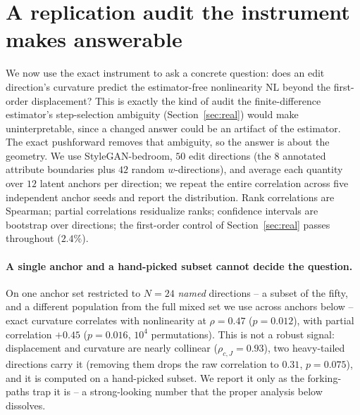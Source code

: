 \documentclass[10pt]{article}
\begin{document}
\section{A replication audit the instrument makes answerable}
\label{sec:negative}
We now use the exact instrument to ask a concrete question: does an edit direction's curvature
predict the estimator-free nonlinearity $\mathrm{NL}$ beyond the first-order displacement? This is
exactly the kind of audit the finite-difference estimator's step-selection ambiguity
(Section~\ref{sec:real}) would make uninterpretable, since a changed answer could be an artifact of
the estimator. The exact pushforward removes that ambiguity, so the answer is about the geometry. We use StyleGAN-bedroom,
$50$ edit directions (the $8$ annotated attribute boundaries plus $42$ random $w$-directions), and
average each quantity over $12$ latent anchors per direction; we repeat the entire correlation
across five independent anchor seeds and report the distribution. Rank correlations are Spearman;
partial correlations residualize ranks; confidence intervals are bootstrap over directions; the
first-order control of Section~\ref{sec:real} passes throughout ($2.4\%$).

\paragraph{A single anchor and a hand-picked subset cannot decide the question.} On one anchor
set restricted to $N{=}24$ \emph{named} directions -- a subset of the fifty, and a different
population from the full mixed set we use across anchors below -- exact curvature correlates with
nonlinearity at $\rho=0.47$ ($p=0.012$), with partial correlation $+0.45$ ($p=0.016$, $10^4$
permutations). This is not a robust signal: displacement and curvature are nearly collinear
($\rho_{c,J}=0.93$), two heavy-tailed directions carry it (removing them drops the raw correlation
to $0.31$, $p=0.075$), and it is computed on a hand-picked subset. We report it only as the
forking-paths trap it is -- a strong-looking number that the proper analysis below dissolves.
\end{document}
